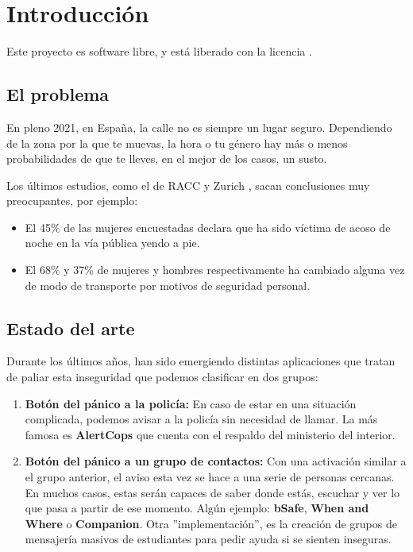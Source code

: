 \chapter{Introducción}

Este proyecto es software libre, y está liberado con la licencia \cite{gplv3}.

\section{El problema}
En pleno 2021, en España, la calle no es siempre un lugar seguro. Dependiendo de la zona por la que te muevas, la hora o tu género
hay más o menos probabilidades de que te lleves, en el mejor de los casos, un susto.

Los últimos estudios, como el de RACC y Zurich \cite{racc-zurich}, sacan conclusiones muy preocupantes, por ejemplo: 
\begin{itemize}
  \item El 45\% de las mujeres encuestadas declara que ha sido víctima de acoso de noche en la vía pública yendo a pie.
  \item El 68\% y 37\% de mujeres y hombres respectivamente ha cambiado alguna vez de modo de transporte por motivos de seguridad personal.
\end{itemize}

\section{Estado del arte}\label{sec:art}
Durante los últimos años, han sido emergiendo distintas aplicaciones que tratan de paliar esta inseguridad que podemos clasificar en dos grupos:
\begin{enumerate}
\item \textbf{Botón del pánico a la policía:} En caso de estar en una situación complicada, podemos avisar a la policía sin necesidad de llamar. La más famosa es \textbf{AlertCops} que cuenta con el respaldo del ministerio del interior.
\item \textbf{Botón del pánico a un grupo de contactos:} Con una activación similar a el grupo anterior, el aviso esta vez se hace a una serie de personas cercanas. En muchos casos, estas serán capaces de saber donde estás, escuchar y ver lo que pasa a partir de ese momento. Algún ejemplo: \textbf{bSafe}, \textbf{When and Where} o \textbf{Companion}.
Otra ''implementación'', es la creación de grupos de mensajería masivos de estudiantes para pedir ayuda si se sienten inseguras.
\end{enumerate}


